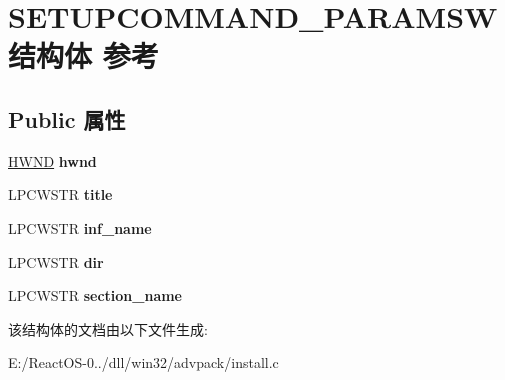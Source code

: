 \hypertarget{struct_s_e_t_u_p_c_o_m_m_a_n_d___p_a_r_a_m_s_w}{}\section{S\+E\+T\+U\+P\+C\+O\+M\+M\+A\+N\+D\+\_\+\+P\+A\+R\+A\+M\+S\+W结构体 参考}
\label{struct_s_e_t_u_p_c_o_m_m_a_n_d___p_a_r_a_m_s_w}
\subsection*{Public 属性}
\begin{DoxyCompactItemize}
\item 
\mbox{\label{struct_s_e_t_u_p_c_o_m_m_a_n_d___p_a_r_a_m_s_w_a791acc009da682576b951f1ae2573b2a}} 
\hyperlink{interfacevoid}{H\+W\+ND} {\bfseries hwnd}
\item 
\mbox{\label{struct_s_e_t_u_p_c_o_m_m_a_n_d___p_a_r_a_m_s_w_a633887a77bd7c425dcee46b2f42eb40b}} 
L\+P\+C\+W\+S\+TR {\bfseries title}
\item 
\mbox{\label{struct_s_e_t_u_p_c_o_m_m_a_n_d___p_a_r_a_m_s_w_a69560e63d2280e1843def85111ea834d}} 
L\+P\+C\+W\+S\+TR {\bfseries inf\+\_\+name}
\item 
\mbox{\label{struct_s_e_t_u_p_c_o_m_m_a_n_d___p_a_r_a_m_s_w_a86ef9b46a098f5a0e98d4f8fe127405c}} 
L\+P\+C\+W\+S\+TR {\bfseries dir}
\item 
\mbox{\label{struct_s_e_t_u_p_c_o_m_m_a_n_d___p_a_r_a_m_s_w_a3b99fbc59397ac4f47ce26a5a31cee20}} 
L\+P\+C\+W\+S\+TR {\bfseries section\+\_\+name}
\end{DoxyCompactItemize}


该结构体的文档由以下文件生成\+:\begin{DoxyCompactItemize}
\item 
E\+:/\+React\+O\+S-\/0../dll/win32/advpack/install.\+c\end{DoxyCompactItemize}
